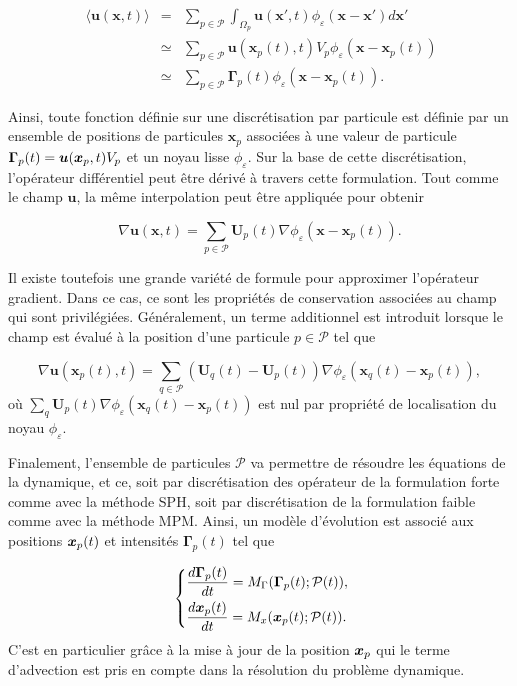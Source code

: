 \begin{eqnarray*}~\label{eq:part_approx}
    \langle \bm{u}(\bm{x}, t) \rangle &=& \sum_{p \in \mathcal P} \int_{\Omega_p} \bm{u}(\bm{x}', t) \phi_\varepsilon(\bm{x}-\bm{x}') d\bm{x}' \\
    &\simeq& \sum_{p \in \mathcal P} \bm{u}(\bm{x}_p(t), t) V_p \phi_\varepsilon (\bm{x}-\bm{x}_p(t)) \\
    &\simeq& \sum_{p \in \mathcal P} \bm{\Gamma}_p(t) \phi_\varepsilon (\bm{x}-\bm{x}_p(t)).
\end{eqnarray*}

Ainsi, toute fonction définie sur une discrétisation par particule est définie par un ensemble de positions de particules $\bm{x}_p$ associées à une valeur de particule $\bm{\Gamma}_p(t) = \bm{u}(\bm{x}_p, t) V_p$ et un noyau lisse $\phi_\varepsilon$. Sur la base de cette discrétisation, l'opérateur différentiel peut être dérivé à travers cette formulation. Tout comme le champ $\bm u$, la même interpolation peut être appliquée pour obtenir

\begin{equation*}
    \nabla \bm{u}(\bm{x}, t) = \sum_{p \in \mathcal P} \bm{U}_p(t) \nabla \phi_\varepsilon (\bm{x}-\bm{x}_p(t)).
\end{equation*}

Il existe toutefois une grande variété de formule pour approximer l'opérateur gradient. Dans ce cas, ce sont les propriétés de conservation associées au champ qui sont privilégiées.
Généralement, un terme additionnel est introduit lorsque le champ est évalué à la position d'une particule $p \in \mathcal P$ tel que

\begin{equation*}
    \nabla \bm{u}(\bm{x}_p(t), t) = \sum_{q \in \mathcal P} (\bm{U}_q(t) - \bm{U}_p(t)) \nabla \phi_\varepsilon (\bm{x}_q(t)-\bm{x}_p(t)),
\end{equation*}où $\sum_q \bm{U}_p(t) \nabla \phi_\varepsilon (\bm{x}_q(t)-\bm{x}_p(t))$ est nul par propriété de localisation du noyau $\phi_\varepsilon$.

Finalement, l'ensemble de particules $\mathcal P$ va permettre de résoudre les équations de la dynamique, et ce, soit par discrétisation des opérateur de la formulation forte comme avec la méthode SPH, soit par discrétisation de la formulation faible comme avec la méthode MPM. Ainsi, un modèle d'évolution est associé aux positions $\bm{x}_p(t)$ et intensités $\bm \Gamma_p(t)$ tel que

\begin{gather}~\label{eq:model_evol}
    \left\{\begin{aligned}
         & \frac{d\bm \Gamma_p(t)}{dt} = M_\Gamma(\bm \Gamma_p(t); \mathcal P(t)), \\
         & \frac{d \bm{x}_p(t)}{d t} = M_x(\bm{x}_p(t); \mathcal P(t)).
    \end{aligned} \right.
\end{gather}C'est en particulier grâce à la mise à jour de la position $\bm{x}_p$ qui le terme d'advection est pris en compte dans la résolution du problème dynamique.

